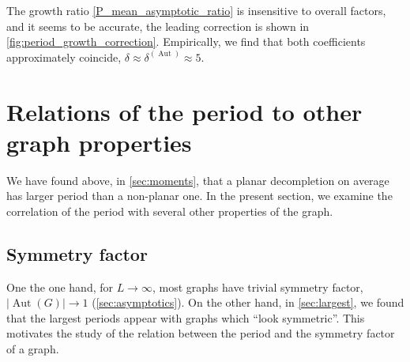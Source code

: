 \documentclass[12pt,a4paper]{article}
\newcommand{\abs}[1]{\lvert #1 \rvert}
\newcommand{\Aut}{\operatorname{Aut}}
\renewcommand{\|}{\rule[-0.4ex]{0.2ex}{1.2em}}
\begin{document}
The growth ratio \cref{P_mean_asymptotic_ratio} is insensitive to overall factors, and it seems to be accurate, the leading correction is shown in \cref{fig:period_growth_correction}. Empirically, we find that both coefficients approximately coincide, $\delta \approx \delta^{(\Aut)}\approx 5$.








\FloatBarrier





\section{Relations of the period to other graph properties}\label{sec:relations}

We have found above, in \cref{sec:moments}, that a planar decompletion on average has larger period than a non-planar one. In the present section, we examine the correlation of the period with several other properties of the graph.





\subsection{Symmetry factor}\label{sec:relations_symmetry_factor}


One the one hand, for $L\rightarrow \infty$, most graphs have trivial symmetry factor, $\abs{\Aut(G)}\rightarrow 1$ (\cref{sec:asymptotics}). On the other hand, in \cref{sec:largest}, we found that the largest periods appear with graphs which \enquote{look symmetric}. This motivates the study of the relation between the period and the symmetry factor of a graph.
\end{document}
